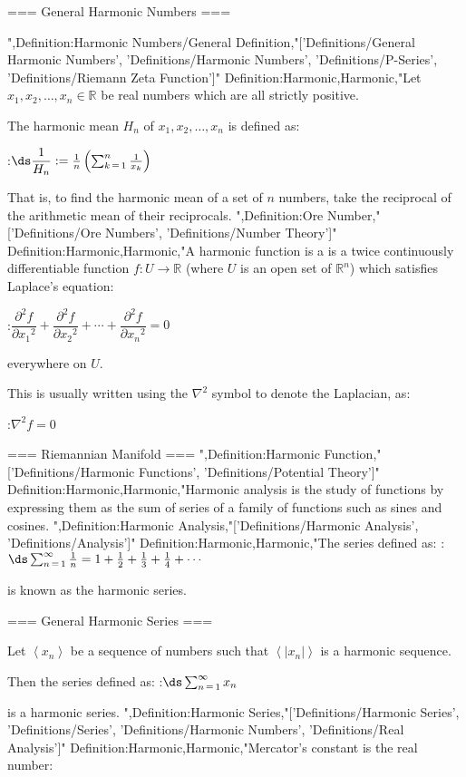 === General Harmonic Numbers ===

",Definition:Harmonic Numbers/General Definition,"['Definitions/General Harmonic Numbers', 'Definitions/Harmonic Numbers', 'Definitions/P-Series', 'Definitions/Riemann Zeta Function']"
Definition:Harmonic,Harmonic,"Let $x_1, x_2, \ldots, x_n \in \mathbb R$ be real numbers which are all strictly positive.

The harmonic mean $H_n$ of $x_1, x_2, \ldots, x_n$ is defined as:

:$\ds \dfrac 1 {H_n} := \frac 1 n \left( \sum_{k \mathop = 1}^n \frac 1 {x_k}  \right)$

That is, to find the harmonic mean of a set of $n$ numbers, take the reciprocal of the arithmetic mean of their reciprocals.
",Definition:Ore Number,"['Definitions/Ore Numbers', 'Definitions/Number Theory']"
Definition:Harmonic,Harmonic,"A harmonic function is a is a twice continuously differentiable function $f: U \to \mathbb R$ (where $U$ is an open set of $\mathbb R^n$) which satisfies Laplace's equation:

:$\dfrac {\partial^2 f} {\partial {x_1}^2} + \dfrac {\partial^2 f} {\partial {x_2}^2} + \cdots + \dfrac {\partial^2 f} {\partial {x_n}^2} = 0$

everywhere on $U$.


This is usually written using the $\nabla^2$ symbol to denote the Laplacian, as:

:$\nabla^2 f = 0$


=== Riemannian Manifold ===
",Definition:Harmonic Function,"['Definitions/Harmonic Functions', 'Definitions/Potential Theory']"
Definition:Harmonic,Harmonic,"Harmonic analysis is the study of functions by expressing them as the sum of series of a family of functions such as sines and cosines.
",Definition:Harmonic Analysis,"['Definitions/Harmonic Analysis', 'Definitions/Analysis']"
Definition:Harmonic,Harmonic,"The series defined as:
:$\ds \sum_{n \mathop = 1}^\infty \frac 1 n = 1 + \frac 1 2 + \frac 1 3 + \frac 1 4 + \cdots$

is known as the harmonic series.


=== General Harmonic Series ===

Let $\left\langle x_n \right\rangle$ be a sequence of numbers such that $\left\langle \left\lvert x_n \right\rvert  \right\rangle$ is a harmonic sequence.


Then the series defined as:
:$\ds \sum_{n \mathop = 1}^\infty x_n$

is a harmonic series.
",Definition:Harmonic Series,"['Definitions/Harmonic Series', 'Definitions/Series', 'Definitions/Harmonic Numbers', 'Definitions/Real Analysis']"
Definition:Harmonic,Harmonic,"Mercator's constant is the real number:







